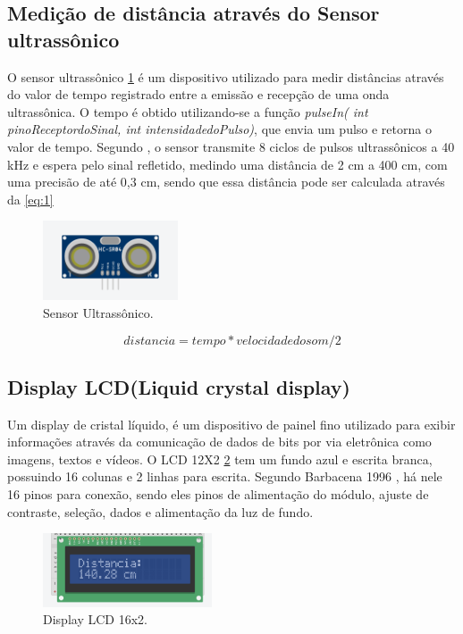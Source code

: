 \documentclass[conference]{IEEEtran}
\begin{document}
\subsection{Medição de distância através do Sensor ultrassônico}

O sensor ultrassônico \ref{fig:ultrassonico} é um dispositivo utilizado para medir distâncias através do valor de tempo registrado entre a emissão e recepção de uma
onda ultrassônica. O tempo é obtido utilizando-se a função \textit{pulseIn( int pinoReceptordoSinal, int intensidadedoPulso)}, que envia um pulso e retorna o valor de
tempo. Segundo \cite{nakatani2014}, o sensor transmite 8 ciclos de pulsos ultrassônicos a 40 kHz e espera pelo sinal refletido, medindo uma distância de 2 cm a 400 cm,
com uma precisão de até 0,3 cm, sendo que essa distância pode ser calculada através da \ref{eq:1}

\begin{figure}[htbp]
    \centerline{
        \includegraphics[width=4cm]{images/sensor-ultrassonico.png}
    }
    \caption{Sensor Ultrassônico.}
    \label{fig:ultrassonico}
\end{figure}


\begin{equation}
    distancia = tempo * velocidade do som / 2 \label{eq:1}
\end{equation}

\subsection{Display LCD(Liquid crystal display)}
Um display de cristal líquido, é um dispositivo de painel fino utilizado para exibir informações através da comunicação de dados de bits por via eletrônica como
imagens, textos e vídeos. O LCD 12X2 \ref{fig:display} tem um fundo azul e escrita branca, possuindo 16 colunas e 2 linhas para escrita. Segundo Barbacena 1996
\cite{barbacena1996display}, há nele 16 pinos para conexão, sendo eles pinos de alimentação do módulo, ajuste de contraste, seleção, dados e alimentação da luz de fundo.

\begin{figure}[htbp]
    \centerline{
        \includegraphics[width=5cm]{images/display.png}
    }
    \caption{Display LCD 16x2.}
    \label{fig:display}
\end{figure}
\end{document}
